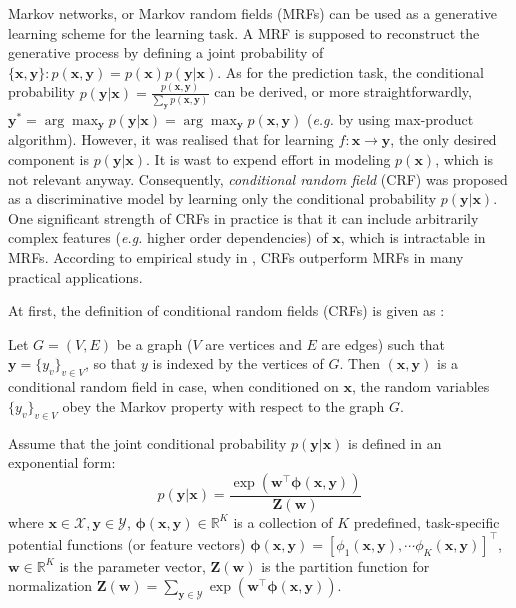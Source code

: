 Markov networks, or Markov random fields (MRFs) can be used as a generative learning scheme for the learning task.    
A MRF is supposed to 
reconstruct the generative process by defining a joint probability of $\{\mathbf{x,y}\}: p(\mathbf{x,y})=p(\mathbf{x})p(\mathbf{y}|\mathbf{x})$. 
As for the prediction task, the conditional probability 
$p(\mathbf{y|x})=\frac{p(\mathbf{x,y})}{\sum_\mathbf{y} p(\mathbf{x,y})}$ can be derived, or more straightforwardly, 
$\mathbf{y}^*=\arg\max_{\mathbf{y}}p(\mathbf{y|x})=\arg\max_{\mathbf{y}}p(\mathbf{x,y})$ (\emph{e.g.} by using max-product algorithm). 
However, it was realised that for learning $f:\mathbf{x}\to\mathbf{y}$, the only desired
component is $p(\mathbf{y|x})$. It is wast to expend effort in modeling $p(\mathbf{x})$, which is not relevant anyway. Consequently, \emph{conditional random field} (CRF) was proposed \citep{CRF} as 
a discriminative model by learning only the conditional probability $p(\mathbf{y|x})$. One significant strength of CRFs in practice is that it can include arbitrarily complex features (\emph{e.g.} higher order dependencies) 
of $\mathbf{x}$, which is intractable in MRFs. According to empirical study in \citep{Kumar03,CRF}, CRFs outperform MRFs in many practical applications. 

At first, the definition of conditional random fields (CRFs) is given as \citep{CRF}: 
\begin{definition}
    Let $G=(V,E)$ be a graph ($V$ are vertices and $E$ are edges) such that $\mathbf{y}=\{y_v\}_{v\in V}$, so that $y$ is indexed by the vertices of $G$. Then $(\mathbf{x,y})$ is a 
        conditional random field in case, when conditioned on $\mathbf{x}$, the random variables $\{y_v\}_{v\in V}$ obey the Markov property with respect to 
    the graph $G$.   
\label{def:CRF}
\end{definition}
Assume that the joint conditional probability $p(\mathbf{y|x})$ is defined in an exponential form: 
\begin{equation}
    p(\mathbf{y|x})=\frac{\exp(\mathbf{w}^\top \boldsymbol{\phi}(\mathbf{x,y}))}{\mathbf{Z(w)}}
\end{equation}
where $\mathbf{x}\in\mathcal{X},\mathbf{y}\in\mathcal{Y}$, $\boldsymbol{\phi}(\mathbf{x,y})\in\mathbb{R}^K$ is a collection of $K$ predefined, task-specific potential functions  (or feature vectors)
$\boldsymbol{\phi}(\mathbf{x,y})=[\phi_1(\mathbf{x,y}),\cdots \phi_K(\mathbf{x,y})]^\top$, $\mathbf{w}\in\mathbb{R}^K$ is the parameter vector,  
$\mathbf{Z(w)}$ is the partition function for normalization $\mathbf{Z(w)}=\sum_{\mathbf{y}\in\mathcal{Y}} \exp(\mathbf{w}^\top \boldsymbol{\phi}(\mathbf{x,y}))$. 

